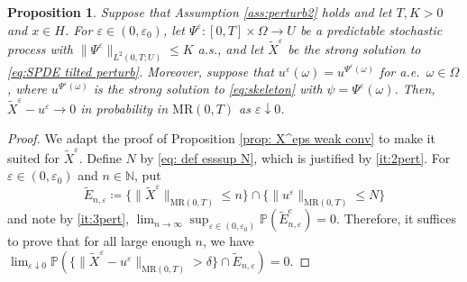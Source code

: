 \documentclass{amsart}
\renewcommand{\MR}{\mathrm{MR}}
\newcommand{\<}{\langle}
\newcommand{\?}{\rangle}
\newcommand{\col}{\colon}
\newcommand{\bphieps}{\Psi^{\eps}}
\theoremstyle{plain}
\theoremstyle{remark}
\theoremstyle{plain}
\newtheorem{proposition}[theorem]{Proposition}
\numberwithin{equation}{section}
\def\N{{\mathbb N}}
\renewcommand{\P}{\mathbb{P}}
\newcommand{\om}{\omega}
\newcommand{\Om}{\Omega}
\newcommand{\eps}{\varepsilon}
\begin{document}
\begin{proposition}\label{prop:stoch continuity perturb2}
   Suppose that Assumption \ref{ass:perturb2} holds and let $T,K>0$  and $x\in H$. For $\eps\in(0,\eps_0)$, let $\bphieps\col [0,T]\times \Om\to U$  be a predictable stochastic process with   $\|\bphieps\|_{L^2(0,T;U)}\leq K$ a.s., and let   $\tilde{X}^\eps$ be the strong solution to 
  \eqref{eq:SPDE tilted perturb}. 
Moreover, suppose that $u^\eps(\om)=u^{\bphieps(\om)}$ for a.e.\ $\om\in\Om$, where $u^{\bphieps(\om)}$  is the strong solution  to \eqref{eq:skeleton} with $\psi=\bphieps(\om)$. 
Then, $\tilde{X}^\eps-u^\eps\to 0$ in probability in $\MR(0,T)$ as $\eps\downarrow0$. 
\end{proposition}
\begin{proof}
  We adapt the proof of Proposition \ref{prop: X^eps weak conv} to make it suited for  $\tilde{X}^\eps$. Define $N$ by \eqref{eq: def esssup N}, which is justified by \ref{it:2pert}. 
For $\eps\in(0,\eps_0)$ and $n\in\N$,  put 
\[
\tilde{E}_{n,\eps}\coloneqq \{\|\tilde{X}^\eps\|_{\MR(0,T)}\leq n\}\cap \{\|u^{\eps}\|_{\MR(0,T)}\leq N\} 
\]
and note by \ref{it:3pert}, $\lim_{n\to\infty}\sup_{\eps\in(0,\eps_0)}\P(\tilde{E}_{n,\eps}^c)=0$. Therefore, it suffices to prove that for all large enough $n$, we have  $\lim_{\eps\downarrow 0}\P(\{\|\tilde{X}^\eps- u^{\eps}\|_{\MR(0,T)}>\delta\}\cap \tilde{E}_{n,\eps})=0$. 


\end{proof}
\end{document}
